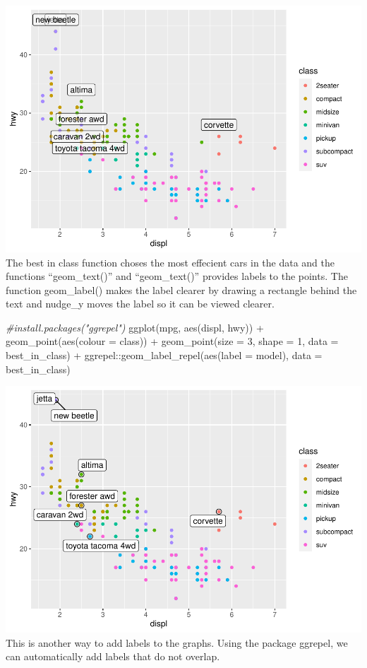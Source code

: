 \documentclass[
]{article}
\newenvironment{Shaded}{\begin{snugshade}}{\end{snugshade}}
\newcommand{\AttributeTok}[1]{\textcolor[rgb]{0.77,0.63,0.00}{#1}}
\newcommand{\CommentTok}[1]{\textcolor[rgb]{0.56,0.35,0.01}{\textit{#1}}}
\newcommand{\DecValTok}[1]{\textcolor[rgb]{0.00,0.00,0.81}{#1}}
\newcommand{\FunctionTok}[1]{\textcolor[rgb]{0.00,0.00,0.00}{#1}}
\newcommand{\NormalTok}[1]{#1}
\newcommand{\SpecialCharTok}[1]{\textcolor[rgb]{0.00,0.00,0.00}{#1}}
\begin{document}
\includegraphics{Assignments_files/figure-latex/unnamed-chunk-58-1.pdf}
The best in class function choses the most effecient cars in the data
and the functions ``geom\_text()'' and ``geom\_text()'' provides labels
to the points. The function geom\_label() makes the label clearer by
drawing a rectangle behind the text and nudge\_y moves the label so it
can be viewed clearer.

\begin{Shaded}
\begin{Highlighting}[]
\CommentTok{\#install.packages("ggrepel")}
\FunctionTok{ggplot}\NormalTok{(mpg, }\FunctionTok{aes}\NormalTok{(displ, hwy)) }\SpecialCharTok{+}
  \FunctionTok{geom\_point}\NormalTok{(}\FunctionTok{aes}\NormalTok{(}\AttributeTok{colour =}\NormalTok{ class)) }\SpecialCharTok{+}
  \FunctionTok{geom\_point}\NormalTok{(}\AttributeTok{size =} \DecValTok{3}\NormalTok{, }\AttributeTok{shape =} \DecValTok{1}\NormalTok{, }\AttributeTok{data =}\NormalTok{ best\_in\_class) }\SpecialCharTok{+}
\NormalTok{  ggrepel}\SpecialCharTok{::}\FunctionTok{geom\_label\_repel}\NormalTok{(}\FunctionTok{aes}\NormalTok{(}\AttributeTok{label =}\NormalTok{ model), }\AttributeTok{data =}\NormalTok{ best\_in\_class)}
\end{Highlighting}
\end{Shaded}

\includegraphics{Assignments_files/figure-latex/unnamed-chunk-59-1.pdf}
This is another way to add labels to the graphs. Using the package
ggrepel, we can automatically add labels that do not overlap.
\end{document}
